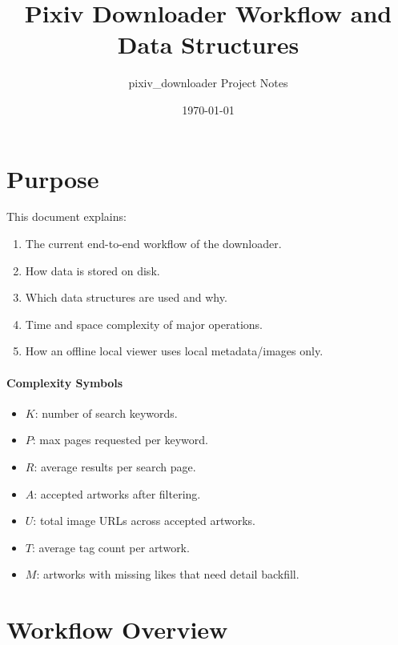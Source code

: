 \documentclass[11pt]{article}
\title{Pixiv Downloader Workflow and Data Structures}
\author{pixiv\_downloader Project Notes}
\date{\today}
\begin{document}
\maketitle

\section{Purpose}
This document explains:
\begin{enumerate}
    \item The current end-to-end workflow of the downloader.
    \item How data is stored on disk.
    \item Which data structures are used and why.
    \item Time and space complexity of major operations.
    \item How an offline local viewer uses local metadata/images only.
\end{enumerate}

\paragraph{Complexity Symbols}
\begin{itemize}
    \item $K$: number of search keywords.
    \item $P$: max pages requested per keyword.
    \item $R$: average results per search page.
    \item $A$: accepted artworks after filtering.
    \item $U$: total image URLs across accepted artworks.
    \item $T$: average tag count per artwork.
    \item $M$: artworks with missing likes that need detail backfill.
\end{itemize}

\section{Workflow Overview}
\end{document}
